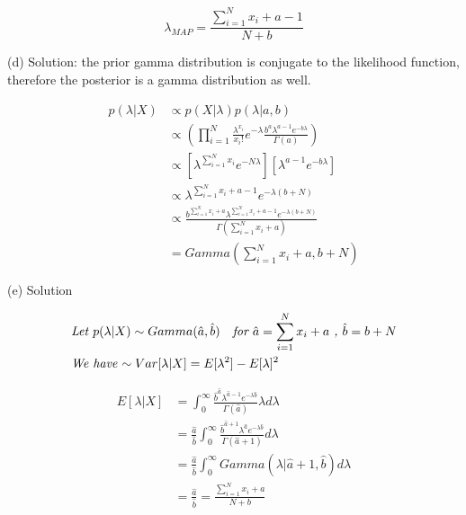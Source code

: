 \documentclass[11pt]{report}
\begin{document}
\begin{equation*}
\lambda_{MAP} = \frac{{\sum_{i=1}^N{x_i}} + a - 1}{N + b}
\end{equation*}

 \pagebreak

\begin{flushleft}
(d) Solution: the prior gamma distribution is conjugate to the likelihood function, therefore the posterior is a gamma distribution as well. 
\end{flushleft}
\begin{equation*}
\begin{split}
p(\lambda|X) &\propto p(X|\lambda) p(\lambda|a,b) \\
&\propto (\prod_{i=1}^N\frac{\lambda^{x_i}}{x_i!} e^{-\lambda} \frac{b^a\lambda^{a-1}e^{-b\lambda}}{\Gamma(a)}) \\
&\propto [\lambda^{\sum_{i=1}^Nx_i} e^{-N\lambda}][\lambda^{a-1}e^{-b\lambda}] \\
&\propto \lambda^{\sum_{i=1}^Nx_i + a - 1} e^{-\lambda(b + N)} \\
&\propto \frac{b^{\sum_{i=1}^Nx_i + a}\lambda^{\sum_{i=1}^Nx_i + a - 1} e^{-\lambda(b + N)}}{\Gamma(\sum_{i=1}^Nx_i + a)} \\
& = \textit{Gamma}(\sum_{i=1}^Nx_i + a, b + N)
\end{split}
\end{equation*}

\begin{flushleft}
(e) Solution
\end{flushleft}
\begin{align*}
&\textit{Let $p(\lambda|X) \sim Gamma(\hat{a}, \hat{b})$ \; for $\hat{a} = \sum_{i=1}^Nx_i + a$ , $\hat{b} = b+ N $} \\
&\textit{We have $\sim Var[\lambda|X] = E[\lambda^2] - E[\lambda]^2$}
\end{align*}

\begin{equation*}
\begin{split}
E[\lambda|X] &= \int^{\infty}_0\frac{ \hat{b}^{\hat{a} } \lambda^{\hat{a} - 1} e^{-\lambda\hat{b}}}{\Gamma(\hat{a})} \lambda d\lambda \\
&= \frac{\hat{a}}{\hat{b}} \int^{\infty}_0 \frac{\hat{b}^{\hat{a} + 1} \lambda^{\hat{a}} e^{-\lambda \hat{b}} }{\Gamma{(\hat{a} + 1)}} d\lambda \\
&= \frac{\hat{a}}{\hat{b}} \int^{\infty}_0 Gamma(\lambda|\hat{a} + 1, \hat{b}) d\lambda \\
&= \frac{\hat{a}}{\hat{b}} = \frac{{\sum_{i=1}^N{x_i}} + a}{N + b} \\
\end{split} 
\end{equation*}
\end{document}
